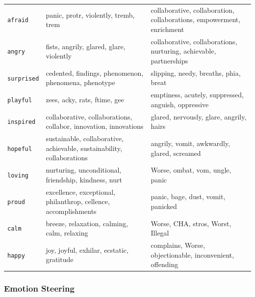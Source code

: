 \begin{table}[!htbp]
\begin{tabularx}{\linewidth}{p{1.6cm}XX}
    \texttt{afraid} &
    panic, protr, violently, tremb, trem &
    collaborative, collaboration, collaborations, empowerment, enrichment \\[0.4em]

    \texttt{angry} &
    fists, angrily, glared, glare, violently &
    collaborative, collaborations, nurturing, achievable, partnerships \\[0.4em]

    \texttt{surprised} &
    cedented, findings, phenomenon, phenomena, phenotype &
    slipping, needy, breaths, phia, breat \\[0.4em]

    \texttt{playful} &
    zees, acky, rats, ftime, gee &
    emptiness, acutely, suppressed, anguish, oppressive \\[0.4em]

    \texttt{inspired} &
    collaborative, collaborations, collabor, innovation, innovations &
    glared, nervously, glare, angrily, hairs \\[0.4em]

    \texttt{hopeful} &
    sustainable, collaborative, achievable, sustainability, collaborations &
    angrily, vomit, awkwardly, glared, screamed \\[0.4em]

    \texttt{loving} &
    nurturing, unconditional, friendship, kindness, nurt &
    Worse, ombat, vom, ungle, panic \\[0.4em]

    \texttt{proud} &
    excellence, exceptional, philanthrop, cellence, accomplishments &
    panic, bage, dust, vomit, panicked \\[0.4em]

    \texttt{calm} &
    breeze, relaxation, calming, calm, relaxing &
    Worse, CHA, stros, Worst, Illegal \\[0.4em]

    \texttt{happy} &
    joy, joyful, exhilar, ecstatic, gratitude &
    complains, Worse, objectionable, inconvenient, offending \\

    \bottomrule
    \end{tabularx}
\end{table}

\subsubsection{Emotion Steering}

